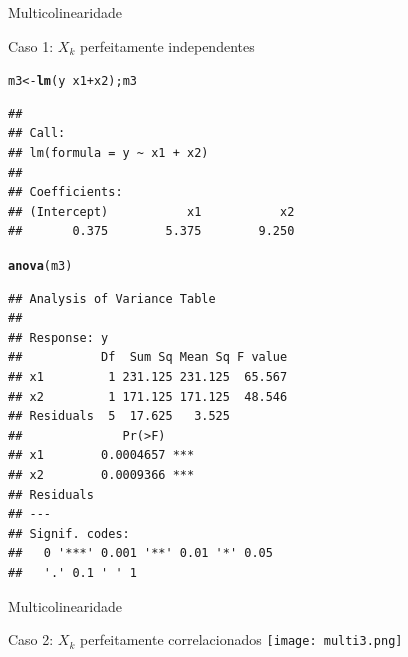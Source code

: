 \documentclass{beamer}\usepackage[]{graphicx}\usepackage[]{color}
\makeatletter
\newcommand{\hlopt}[1]{\textcolor[rgb]{0,0,0}{#1}}%
\newcommand{\hlstd}[1]{\textcolor[rgb]{0.345,0.345,0.345}{#1}}%
\newcommand{\hlkwb}[1]{\textcolor[rgb]{0.69,0.353,0.396}{#1}}%
\newcommand{\hlkwd}[1]{\textcolor[rgb]{0.737,0.353,0.396}{\textbf{#1}}}%
\newenvironment{kframe}{%
 \def\at@end@of@kframe{}%
 \ifinner\ifhmode%
  \def\at@end@of@kframe{\end{minipage}}%
  \begin{minipage}{\columnwidth}%
 \fi\fi%
 \def\FrameCommand##1{\hskip\@totalleftmargin \hskip-\fboxsep
 \colorbox{shadecolor}{##1}\hskip-\fboxsep
     \hskip-\linewidth \hskip-\@totalleftmargin \hskip\columnwidth}%
 \MakeFramed {\advance\hsize-\width
   \@totalleftmargin\z@ \linewidth\hsize
   \@setminipage}}%
 {\par\unskip\endMakeFramed%
 \at@end@of@kframe}
\newenvironment{knitrout}{}{} %
\renewenvironment{knitrout}{\setlength{\topsep}{0mm}}{}
\makeatother
\begin{document}
\begin{frame}[fragile]{Multicolinearidade}

Caso 1: $X_k$ perfeitamente independentes
\vfill

\begin{knitrout}\tiny
{}\color{fgcolor}\begin{kframe}
\begin{alltt}
\hlstd{m3} \hlkwb{<-} \hlkwd{lm}\hlstd{(y} \hlopt{~} \hlstd{x1} \hlopt{+} \hlstd{x2); m3}
\end{alltt}
\begin{verbatim}
## 
## Call:
## lm(formula = y ~ x1 + x2)
## 
## Coefficients:
## (Intercept)           x1           x2  
##       0.375        5.375        9.250
\end{verbatim}
\begin{alltt}
\hlkwd{anova}\hlstd{(m3)}
\end{alltt}
\begin{verbatim}
## Analysis of Variance Table
## 
## Response: y
##           Df  Sum Sq Mean Sq F value
## x1         1 231.125 231.125  65.567
## x2         1 171.125 171.125  48.546
## Residuals  5  17.625   3.525        
##              Pr(>F)    
## x1        0.0004657 ***
## x2        0.0009366 ***
## Residuals              
## ---
## Signif. codes:  
##   0 '***' 0.001 '**' 0.01 '*' 0.05
##   '.' 0.1 ' ' 1
\end{verbatim}
\end{kframe}
\end{knitrout}

\end{frame}



\begin{frame}{Multicolinearidade}
 
Caso 2: $X_k$ perfeitamente correlacionados
\vfill
\texttt{[image: multi3.png]}

\end{frame}
\end{document}
